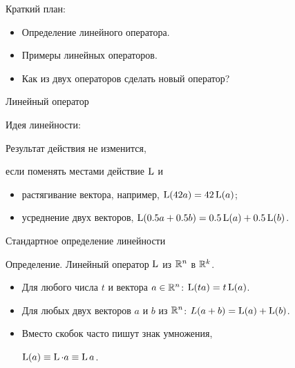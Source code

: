 

\begin{frame} %



\end{frame}


\begin{frame}{Краткий план:}

\begin{itemize}[<+->]
  \item Определение линейного оператора.
  \item Примеры линейных операторов.
  \item Как из двух операторов сделать новый оператор?
\end{itemize}

\end{frame}
    


\begin{frame}{Линейный оператор}


\alert{Идея линейности}:
  
Результат действия не изменится, 

если поменять местами действие $\operatorname{L}$ и

\begin{itemize}[<+->]
    \item растягивание вектора, например, $\operatorname{L}(42a)=42\operatorname{L}(a)$;
    \item усреднение двух векторов, $\operatorname{L}(0.5a+0.5b)=0.5\operatorname{L}(a) + 0.5\operatorname{L}(b)$.
  \end{itemize}


\end{frame}


\begin{frame}{Стандартное определение линейности}

Определение. \alert{Линейный оператор} $\operatorname{L}$ из $\mathbb{R}^n$ в $\mathbb{R}^k$.

\begin{itemize}[<+->]
  \item Для любого числа $t$ и вектора $a \in \mathbb{R}^n$: $\operatorname{L}(t a) = t\operatorname{L}(a)$.
  \item Для любых двух векторов $a$ и $b$ из $\mathbb{R}^n$: $L(a + b) = \operatorname{L}(a) + \operatorname{L}(b)$.
\item Вместо скобок часто пишут знак умножения, 

$\operatorname{L}(a) \equiv \operatorname{L} \cdot a \equiv \operatorname{L} a$.

\end{itemize}



\end{frame}


